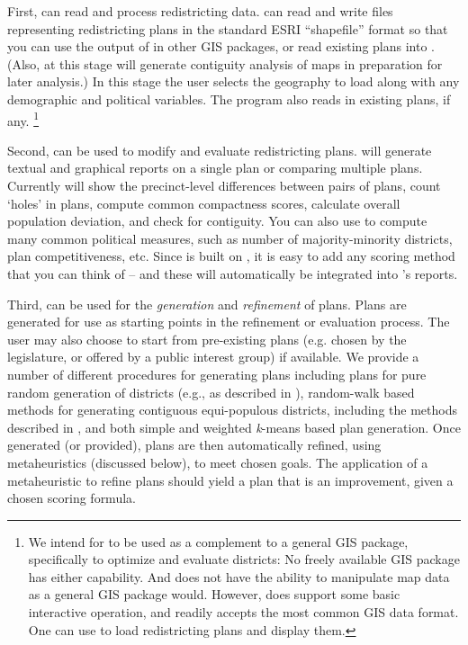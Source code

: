 \documentclass[article]{JSSstyle/jss}
\begin{document}
First,  can read and process redistricting data.  can read and write files representing redistricting plans in the standard ESRI ``shapefile'' format so that you can use the output of  in other GIS packages, or read existing plans into . (Also, at this stage   will generate contiguity analysis of maps in preparation for later analysis.) In this stage the user selects the geography to load along with any demographic and political variables. The program also reads in existing plans, if any. \footnote{We intend for  to be used as a complement to a general GIS package, specifically to optimize and evaluate districts: No freely available GIS package has either capability. And  does not have the ability to manipulate map data as a general GIS package would. However,  does support some basic interactive operation, and readily accepts the most common GIS data format. One can use  to load redistricting plans and display them.}


Second,  can be used to modify and evaluate redistricting plans.  will generate textual and graphical reports on a single plan or comparing multiple plans. Currently  will show the precinct-level differences between pairs of plans, count `holes' in plans, compute common compactness scores, calculate overall population deviation, and check for contiguity. You can also use  to compute many common political measures, such as number of majority-minority districts, plan competitiveness, etc. Since  is built on , it is easy to add any scoring method that you can think of -- and these will automatically be integrated into 's reports.

Third,   can be used for  the \emph{generation} and \emph{refinement} of plans. Plans are generated for use as starting points in the refinement or evaluation process.  The user may also choose to start from pre-existing 
plans (e.g. chosen by the legislature, or offered by a public interest group) if available. We provide a number of different procedures for generating plans including plans for pure random generation of districts  (e.g., as described in \citet{Grofman82}), random-walk based methods for generating contiguous 
equi-populous districts, including the methods described in \citet{CirDarOro00}, and both simple  and weighted \emph{k}-means based plan generation. Once generated (or provided), plans are then automatically refined, using metaheuristics (discussed below), to meet chosen goals.  The application of a metaheuristic to refine plans should yield a plan that is an improvement, given a chosen scoring formula.  
\end{document}
